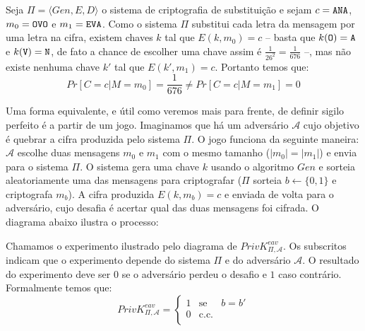 \begin{example}
  Seja $\Pi = \langle Gen, E, D \rangle$ o sistema de criptografia de substituição e sejam $c = \textrm{\tt ANA}$, $m_0 = \textrm{\tt OVO}$ e $m_1 = \textrm{\tt EVA}$.
Como o sistema $\Pi$ substitui cada letra da mensagem por uma letra na cifra, existem chaves $k$ tal que $E(k, m_0) = c$ -- basta que $k(\textrm{\tt O}) = \textrm{\tt A}$ e $k(\textrm{\tt V}) = \textrm{\tt N}$, de fato a chance de escolher uma chave assim é $\frac{1}{26^2} = \frac{1}{676}$ --, mas não existe nenhuma chave $k'$ tal que $E(k', m_1) = c$.
Portanto temos que:
\begin{displaymath}
Pr[C = c | M = m_0] =  \frac{1}{676} \neq Pr[C = c | M = m_1] = 0  
\end{displaymath}
\end{example}

Uma forma equivalente, e útil como veremos mais para frente, de definir sigilo perfeito é a partir de um jogo.
Imaginamos que há um adversário $\mathcal{A}$ cujo objetivo é quebrar a cifra produzida pelo sistema $\Pi$.
O jogo funciona da seguinte maneira: $\mathcal{A}$ escolhe duas mensagens $m_0$ e $m_1$ com o mesmo tamanho ($|m_0| = |m_1|$) e envia para o sistema $\Pi$.
O sistema gera uma chave $k$ usando o algoritmo $Gen$ e sorteia aleatoriamente uma das mensagens para criptografar ($\Pi$ sorteia $b \leftarrow \{0, 1\}$ e criptografa $m_b$).
A cifra produzida $E(k, m_b) = c$ e enviada de volta para o adversário, cujo desafia é acertar qual das duas mensagens foi cifrada.
O diagrama abaixo ilustra o processo:

\begin{center}
\end{center}

Chamamos o experimento ilustrado pelo diagrama de $PrivK^{eav}_{\Pi, \mathcal{A}}$.
Os subscritos indicam que o experimento depende do sistema $\Pi$ e do adversário $\mathcal{A}$.
O resultado do experimento deve ser $0$ se o adversário perdeu o desafio e $1$ caso contrário.
Formalmente temos que:
\begin{displaymath}
  PrivK^{eav}_{\Pi, \mathcal{A}} = \left\{
    \begin{array}{lcl}
      1 & \textrm{se} & b = b'\\
      0 & \textrm{c.c.} &\\
    \end{array}
    \right.
\end{displaymath}

